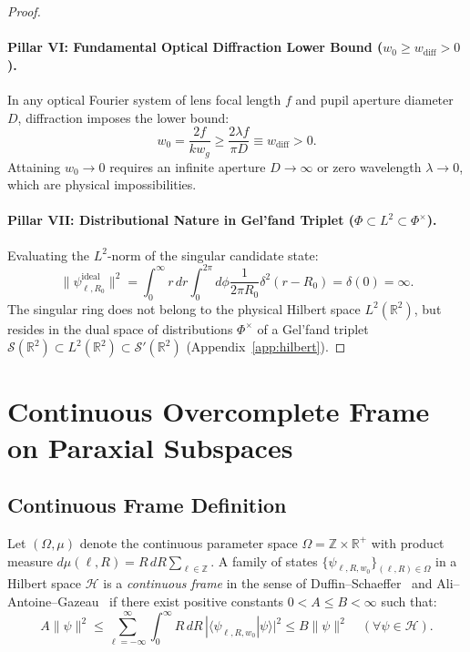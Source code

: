 \documentclass{optica-article}
\begin{document}
\begin{proof}
\paragraph{Pillar VI: Fundamental Optical Diffraction Lower Bound ($w_0 \ge w_{\text{diff}} > 0$).}
In any optical Fourier system of lens focal length $f$ and pupil aperture diameter $D$, diffraction imposes the lower bound:
\begin{equation}
\boxed{w_0 = \frac{2 f}{k w_g} \ge \frac{2 \lambda f}{\pi D} \equiv w_{\text{diff}} > 0.}
\label{eq:pillar6_result}
\end{equation}
Attaining $w_0 \to 0$ requires an infinite aperture $D \to \infty$ or zero wavelength $\lambda \to 0$, which are physical impossibilities.

\paragraph{Pillar VII: Distributional Nature in Gel'fand Triplet ($\Phi \subset L^2 \subset \Phi^\times$).}
Evaluating the $L^2$-norm of the singular candidate state:
\begin{equation}
\boxed{\|\psi_{\ell, R_0}^{\text{ideal}}\|^2 = \int_0^\infty r \, dr \int_0^{2\pi} d\phi \frac{1}{2\pi R_0} \delta^2(r - R_0) = \delta(0) = \infty.}
\label{eq:pillar7_result}
\end{equation}
The singular ring does not belong to the physical Hilbert space $L^2(\mathbb{R}^2)$, but resides in the dual space of distributions $\Phi^\times$ of a Gel'fand triplet $\mathcal{S}(\mathbb{R}^2) \subset L^2(\mathbb{R}^2) \subset \mathcal{S}'(\mathbb{R}^2)$ (Appendix~\ref{app:hilbert}).
\end{proof}


\section{Continuous Overcomplete Frame on Paraxial Subspaces}
\label{sec:frame_theory}

\subsection{Continuous Frame Definition}

Let $(\Omega, \mu)$ denote the continuous parameter space $\Omega = \mathbb{Z} \times \mathbb{R}^+$ with product measure $d\mu(\ell, R) = R \, dR \sum_{\ell \in \mathbb{Z}}$. A family of states $\{\psi_{\ell, R, w_0}\}_{(\ell, R) \in \Omega}$ in a Hilbert space $\mathcal{H}$ is a \emph{continuous frame} in the sense of Duffin--Schaeffer~\cite{Duffin1952} and Ali--Antoine--Gazeau~\cite{Ali1993,Daubechies1990,Christensen2016} if there exist positive constants $0 < A \le B < \infty$ such that:
\begin{equation}
A \|\psi\|^2 \le \sum_{\ell=-\infty}^\infty \int_0^\infty R \, dR \, |\langle \psi_{\ell, R, w_0} | \psi \rangle|^2 \le B \|\psi\|^2 \quad (\forall \psi \in \mathcal{H}).
\label{eq:frame_def}
\end{equation}
\end{document}
